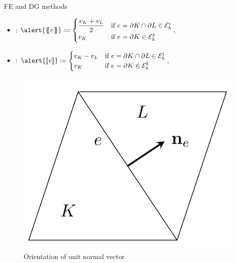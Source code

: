 \begin{frame}{FE and DG methods}
	\begin{minipage}{0.69\textwidth}
	\begin{itemize}
		\item {}: 
		$\alert{\media{v}}\coloneqq
		\begin{cases}
			\dfrac{\vK+\vL}{2}&\text{if } e=\partial K\cap\partial L\in\E_h^i\\
			\vK&\text{if }e=\partial K\in\E_h^b
		\end{cases},$
		\item {}: $
		\alert{\salto{v}}\coloneqq
		\begin{cases}
			\vK-\vL&\text{if } e=\partial K\cap\partial L\in\E_h^i\\
			\vK&\text{if }e=\partial K\in\E_h^b
		\end{cases},$
	\end{itemize}
	\end{minipage}
	\begin{minipage}{0.29\textwidth}
		\begin{figure}
			\centering
			\includegraphics[scale=0.7]{img/figura_tikz.png}
			{\scriptsize{} Orientation of unit normal vector.}
		\end{figure}
	\end{minipage}
\end{frame}


